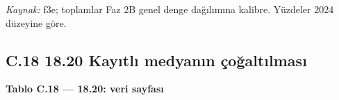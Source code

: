 \endgroup

\emph{Kaynak:} \etiketT{} f3e; toplamlar Faz 2B genel denge dağılımına kalibre. Yüzdeler 2024 düzeyine göre.

\hypertarget{nace_kartlar_16-18-c18-1820-kayux131tlux131-medyanux131n-uxe7oux11faltux131lmasux131}{%
\subsection{C.18 18.20 Kayıtlı medyanın çoğaltılması}\label{nace_kartlar_16-18-c18-1820-kayux131tlux131-medyanux131n-uxe7oux11faltux131lmasux131}}


\textbf{Tablo C.18 --- 18.20: veri sayfası}

\nopagebreak[4]

\begingroup\gbtablo\small

